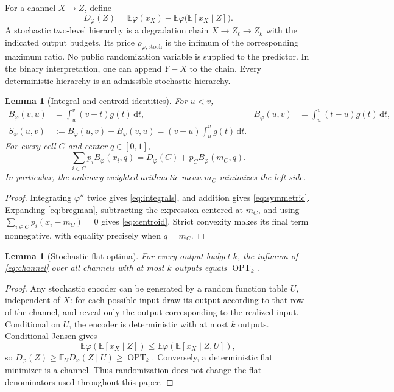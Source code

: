 \documentclass[11pt]{article}
\newtheorem{lemma}[theorem]{Lemma}
\theoremstyle{definition}\newtheorem{definition}[theorem]{Definition}
\theoremstyle{remark}\newtheorem{remark}[theorem]{Remark}
\newcommand{\ph}{\varphi}
\newcommand{\B}{B_{\ph}}
\newcommand{\D}{D_{\ph}}
\newcommand{\OPT}{\operatorname{OPT}}
\newcommand{\E}{\mathbb E}
\newcommand{\rd}{\,\mathrm d}
\newcommand{\stp}{\mathrm{stoch}}
\begin{document}
For a channel $X\to Z$, define
\begin{equation}
\D(Z)=\E\ph(x_X)-\E\ph\bigl(\E[x_X\mid Z]\bigr).
\label{eq:channel}
\end{equation}
A stochastic two-level hierarchy is a degradation chain $X\to Z_\ell\to Z_k$ with the indicated output budgets. Its price $\rho_{\ph,\stp}$ is the infimum of the corresponding maximum ratio. No public randomization variable is supplied to the predictor. In the binary interpretation, one can append $Y-X$ to the chain. Every deterministic hierarchy is an admissible stochastic hierarchy.

\begin{lemma}[Integral and centroid identities]
\label{lem:identities}
For $u<v$,
\begin{align}
\B(v,u)&=\int_u^v(v-t)g(t)\rd t,&
\B(u,v)&=\int_u^v(t-u)g(t)\rd t,\label{eq:integrals}\\
S_\ph(u,v)&:=\B(u,v)+\B(v,u)=(v-u)\int_u^v g(t)\rd t.\label{eq:symmetric}
\end{align}
For every cell $C$ and center $q\in[0,1]$,
\begin{equation}
\sum_{i\in C}p_i\B(x_i,q)=\D(C)+p_C\B(m_C,q).
\label{eq:centroid}
\end{equation}
In particular, the ordinary weighted arithmetic mean $m_C$ minimizes the left side.
\end{lemma}
\begin{proof}
Integrating $\ph''$ twice gives \eqref{eq:integrals}, and addition gives \eqref{eq:symmetric}. Expanding \eqref{eq:bregman}, subtracting the expression centered at $m_C$, and using $\sum_{i\in C}p_i(x_i-m_C)=0$ gives \eqref{eq:centroid}. Strict convexity makes its final term nonnegative, with equality precisely when $q=m_C$.
\end{proof}

\begin{lemma}[Stochastic flat optima]
\label{lem:flat}
For every output budget $k$, the infimum of \eqref{eq:channel} over all channels with at most $k$ outputs equals $\OPT_k$.
\end{lemma}
\begin{proof}
Any stochastic encoder can be generated by a random function table $U$, independent of $X$: for each possible input draw its output according to that row of the channel, and reveal only the output corresponding to the realized input. Conditional on $U$, the encoder is deterministic with at most $k$ outputs. Conditional Jensen gives
\[
\E\ph(\E[x_X\mid Z])\le \E\ph(\E[x_X\mid Z,U]),
\]
so $\D(Z)\ge\E_U\D(Z\mid U)\ge\OPT_k$. Conversely, a deterministic flat minimizer is a channel. Thus randomization does not change the flat denominators used throughout this paper.
\end{proof}
\end{document}
